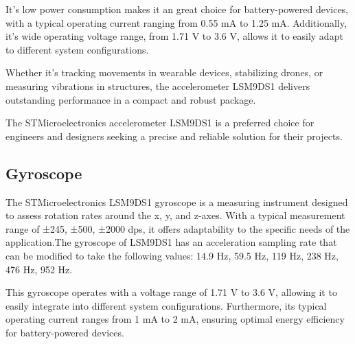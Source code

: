 \bigskip

It's low power consumption makes it an great choice for battery-powered devices, with a typical operating current ranging from 0.55 mA to 1.25 mA. Additionally, it's wide operating voltage range, from 1.71 V to 3.6 V, allows it to easily adapt to different system configurations.

\bigskip

Whether it's tracking movements in wearable devices, stabilizing drones, or measuring vibrations in structures, the accelerometer LSM9DS1 delivers outstanding performance in a compact and robust package.

The STMicroelectronics accelerometer LSM9DS1 is a preferred choice for engineers and designers seeking a precise and reliable solution for their projects.

\bigskip 

\begin{center}
    
\end{center}

\subsection{Gyroscope}

The STMicroelectronics LSM9DS1 gyroscope is a  measuring instrument designed to assess rotation rates around the x, y, and z-axes. With a typical measurement range of ±245, ±500, ±2000 dps, it offers adaptability to the specific needs of the application.The gyroscope of LSM9DS1  has an acceleration sampling rate that can be modified to take the following values: 14.9 Hz, 59.5 Hz, 119 Hz, 238 Hz, 476 Hz, 952 Hz.
\bigskip

This gyroscope operates with a voltage range of 1.71 V to 3.6 V, allowing it to easily integrate into different system configurations. Furthermore, its typical operating current ranges from 1 mA to 2 mA, ensuring optimal energy efficiency for battery-powered devices.

